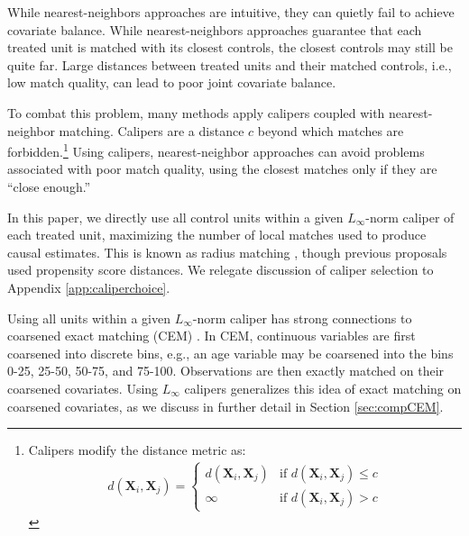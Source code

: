 \documentclass{article}
\newcommand{\bX}{\mathbf{X}}
\begin{document}
While nearest-neighbors approaches are intuitive, they can quietly fail to achieve covariate balance.
While nearest-neighbors approaches guarantee that each treated unit is matched with its closest controls, the closest controls may still be quite far.
Large distances between treated units and their matched controls, i.e., low match quality, can lead to poor joint covariate balance.

To combat this problem, many methods apply calipers coupled with nearest-neighbor matching.
Calipers are a distance $c$ beyond which matches are forbidden.\footnote{Calipers modify the distance metric as:
\begin{align*}
    d(\bX_i, \bX_j) = 
    \begin{cases}
        d(\bX_i, \bX_j) &\text{if } d(\bX_i, \bX_j) \leq c \\
        \infty &\text{if } d(\bX_i, \bX_j) > c
    \end{cases}
\end{align*}}
Using calipers, nearest-neighbor approaches can avoid problems associated with poor match quality, using the closest matches only if they are ``close enough.''

In this paper, we directly use all control units within a given $L_\infty$-norm caliper of each treated unit, maximizing the number of local matches used to produce causal estimates.
This is known as radius matching \citep{dehejia2002propensity}, though previous proposals used propensity score distances.
We relegate discussion of caliper selection to Appendix \ref{app:caliperchoice}.

Using all units within a given $L_\infty$-norm caliper has strong connections to coarsened exact matching (CEM) \citep{iacus2012causal}.
In CEM, continuous variables are first coarsened into discrete bins, e.g., an age variable may be coarsened into the bins 0-25, 25-50, 50-75, and 75-100.
Observations are then exactly matched on their coarsened covariates.
Using $L_\infty$ calipers generalizes this idea of exact matching on coarsened covariates, as we discuss in further detail in Section \ref{sec:compCEM}.
\end{document}
